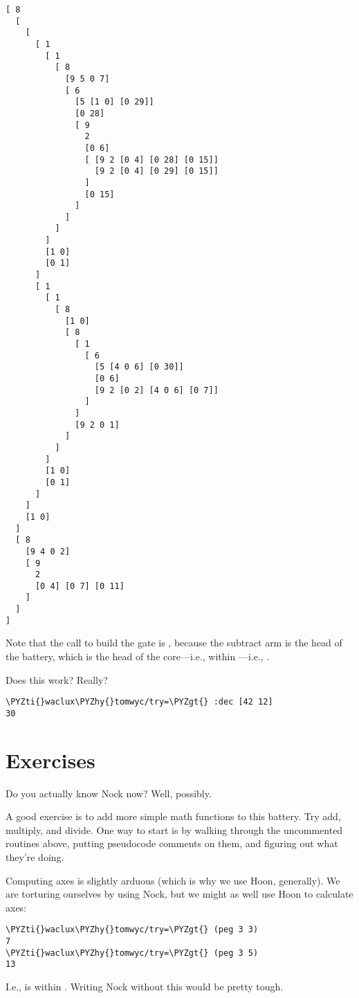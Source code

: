 \begin{framed_shaded}
\begin{Verbatim}[fontsize=\relsize{-2.5},fontseries=b,commandchars=\\\{\}]
[ 8
  [
    [
      [ 1
        [ 1
          [ 8
            [9 5 0 7]
            [ 6
              [5 [1 0] [0 29]]
              [0 28]
              [ 9
                2
                [0 6]
                [ [9 2 [0 4] [0 28] [0 15]]
                  [9 2 [0 4] [0 29] [0 15]]
                ]
                [0 15]
              ]
            ]
          ]
        ]
        [1 0]
        [0 1]
      ]
      [ 1
        [ 1
          [ 8
            [1 0]
            [ 8
              [ 1
                [ 6
                  [5 [4 0 6] [0 30]]
                  [0 6]
                  [9 2 [0 2] [4 0 6] [0 7]]
                ]
              ]
              [9 2 0 1]
            ]
          ]
        ]
        [1 0]
        [0 1]
      ]
    ]
    [1 0]
  ]
  [ 8
    [9 4 0 2]
    [ 9
      2
      [0 4] [0 7] [0 11]
    ]
  ]
]
\end{Verbatim}
\end{framed_shaded}
Note that the call to build the gate is \kode{[9 4 0 2]}, because the
subtract arm is the head of the battery, which is the head of the
core---i.e.,  within ---i.e., .

Does this work?  Really?

\begin{framed_shaded}
\begin{Verbatim}[fontsize=\relsize{-2.5},fontseries=b,commandchars=\\\{\}]
\PYZti{}waclux\PYZhy{}tomwyc/try=\PYZgt{} :dec [42 12]
30
\end{Verbatim}
\end{framed_shaded}

\section{Exercises}

Do you actually know Nock now?  Well, possibly.

A good exercise is to add more simple math functions to this
battery.  Try add, multiply, and divide.  One way to start is by
walking through the uncommented routines above, putting
pseudocode comments on them, and figuring out what they're doing.

Computing axes is slightly arduous (which is why we use Hoon,
generally).  We are torturing ourselves by using Nock, but we
might as well use Hoon to calculate axes:

\begin{framed_shaded}
\begin{Verbatim}[fontsize=\relsize{-2.5},fontseries=b,commandchars=\\\{\}]
\PYZti{}waclux\PYZhy{}tomwyc/try=\PYZgt{} (peg 3 3)
7
\PYZti{}waclux\PYZhy{}tomwyc/try=\PYZgt{} (peg 3 5)
13
\end{Verbatim}
\end{framed_shaded}
I.e.,  is  within .  Writing Nock without this
would be pretty tough.